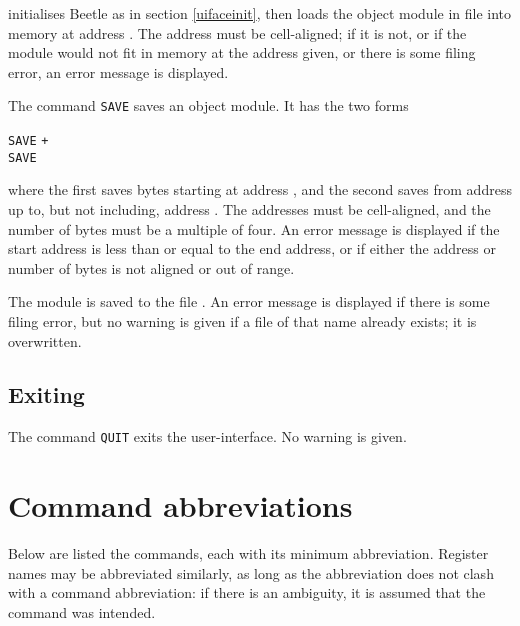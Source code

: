 initialises Beetle as in section \ref{uifaceinit}, then loads the object
module in file  into memory at address . The address
must be cell-aligned; if it is not, or if the module would not fit in memory
at the address given, or there is some filing error, an error message is
displayed.

The command {\tt SAVE} saves an object module. It has the two forms

\begin{center}
{\tt SAVE}   \tt{+} \\
{\tt SAVE}   
\end{center}

where the first saves  bytes starting at address ,
and the second saves from address  up to, but not including,
address . The addresses must be cell-aligned, and the number
of bytes must be a multiple of four. An error message is displayed if the
start address is less than or equal to the end address, or if either the
address or number of bytes is not aligned or out of range.

The module is saved to the file . An error message is displayed if
there is some filing error, but no warning is given if a file of that name
already exists; it is overwritten.

\subsection{Exiting}

The command {\tt QUIT} exits the user-interface. No warning is given.


\section{Command abbreviations} \label{abbrev}

Below are listed the commands, each with its minimum abbreviation. Register
names may be abbreviated similarly, as long as the abbreviation does not
clash with a command abbreviation: if there is an ambiguity, it is assumed
that the command was intended.

